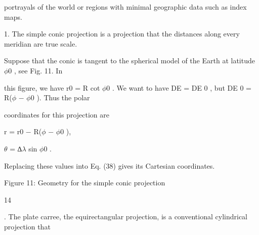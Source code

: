 \documentclass[a4paper,portrait,12pt]{article}
\begin{document}
\begin{flushleft}
portrayals of the world or regions with minimal geographic data such as index maps.
\end{flushleft}


\begin{flushleft}
1. The simple conic projection is a projection that the distances along every meridian are true scale.
\end{flushleft}


\begin{flushleft}
Suppose that the conic is tangent to the spherical model of the Earth at latitude $\phi$0 , see Fig. 11. In
\end{flushleft}


\begin{flushleft}
this figure, we have r0 = R cot $\phi$0 . We want to have DE = DE 0 , but DE 0 = R($\phi$ $-$ $\phi$0 ). Thus the polar
\end{flushleft}


\begin{flushleft}
coordinates for this projection are
\end{flushleft}


\begin{flushleft}
r = r0 $-$ R($\phi$ $-$ $\phi$0 ),
\end{flushleft}





\begin{flushleft}
$\theta$ = ∆$\lambda$ sin $\phi$0 .
\end{flushleft}





\begin{flushleft}
Replacing these values into Eq. (38) gives its Cartesian coordinates.
\end{flushleft}





\begin{flushleft}
Figure 11: Geometry for the simple conic projection
\end{flushleft}





14





\begin{flushleft}
. The plate carree, the equirectangular projection, is a conventional cylindrical projection that
\end{flushleft}
\end{document}

